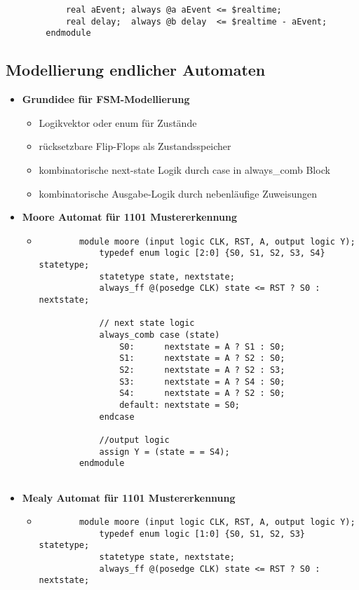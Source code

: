 \begin{itemize}
\begin{itemize}
\begin{lstlisting}
			real aEvent; always @a aEvent <= $realtime;
			real delay;  always @b delay  <= $realtime - aEvent;
		endmodule
		\end{lstlisting}
	\end{itemize}

\end{itemize}

\subsection{Modellierung endlicher Automaten}
\begin{itemize}
\item \textbf{Grundidee für FSM-Modellierung}
	\begin{itemize}
	\item Logikvektor oder enum für Zustände
	\item rücksetzbare Flip-Flops als Zustandsspeicher
	\item kombinatorische next-state Logik durch case in always\_comb Block
	\item kombinatorische Ausgabe-Logik durch nebenläufige Zuweisungen	
	
	\end{itemize}
	
\item \textbf{Moore Automat für 1101 Mustererkennung}
	\begin{itemize}
	\item[]
		\begin{lstlisting}
		module moore (input logic CLK, RST, A, output logic Y);
			typedef enum logic [2:0] {S0, S1, S2, S3, S4} statetype;
			statetype state, nextstate;
			always_ff @(posedge CLK) state <= RST ? S0 : nextstate;
			
			// next state logic
			always_comb case (state)
				S0: 	 nextstate = A ? S1 : S0;
				S1:		 nextstate = A ? S2 : S0;
				S2: 	 nextstate = A ? S2 : S3;
				S3: 	 nextstate = A ? S4 : S0;
				S4: 	 nextstate = A ? S2 : S0;
				default: nextstate = S0;
			endcase
			
			//output logic
			assign Y = (state = = S4);
		endmodule
				
		\end{lstlisting}
	\end{itemize}
	
\item \textbf{Mealy Automat für 1101 Mustererkennung}
	\begin{itemize}
	\item[]
		\begin{lstlisting}
		module moore (input logic CLK, RST, A, output logic Y);
			typedef enum logic [1:0] {S0, S1, S2, S3} statetype;
			statetype state, nextstate;
			always_ff @(posedge CLK) state <= RST ? S0 : nextstate;
			

\end{lstlisting}
\end{itemize}
\end{itemize}
